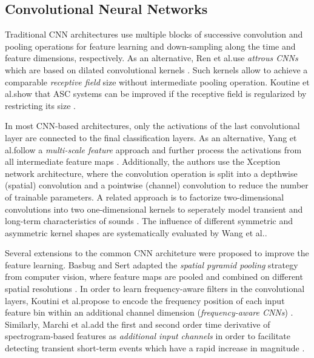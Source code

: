 \documentclass[applsci,article,submit,oneauthor,pdftex]{Definitions/mdpi}
\makeatletter
\newcommand{\etal}{{et al}.\@ }
\makeatother
\begin{document}
\subsection{Convolutional Neural Networks}
\label{sec:cnn}

Traditional CNN architectures use multiple blocks of successive convolution and pooling operations for feature learning and  down-sampling along the time and feature dimensions, respectively.
As an alternative, Ren \etal use \textit{attrous CNNs} which are based on dilated convolutional kernels \citep{Ren:2019:AttrousCNNAttention:ICASSP}. 
Such kernels allow to achieve a comparable \textit{receptive field} size without intermediate pooling operation.
Koutine \etal show that ASC systems can be improved if the receptive field is regularized by restricting its size \citep{Koutini:2019:ASC:DCASE}. 

In most CNN-based architectures, only the activations of the last convolutional layer are connected to the final classification layers.
As an alternative, Yang \etal follow a \textit{multi-scale feature} approach and further process the activations from all intermediate feature maps \citep{Yang:2018:MultiScaleFeatures:DCASE}.
Additionally, the authors use the Xception network architecture, where the convolution operation is split into a depthwise (spatial) convolution and a pointwise (channel) convolution to reduce the number of trainable parameters.
A related approach is to factorize two-dimensional convolutions into two  one-dimensional kernels to seperately model transient and long-term characteristics of sounds \citep{Cho:DCASE:LargeMarginCNN:DCASE, Sharma:2019:SoundClassification:ARXIV}.
The influence of different symmetric and asymmetric kernel shapes are systematically evaluated by Wang \etal  \citep{Wang:2017:ASC:ISCE}.

Several extensions to the common CNN architeture were proposed to improve the feature learning.
Basbug and Sert adapted the \textit{spatial pyramid pooling} strategy from computer vision, where feature maps are pooled and combined on different spatial resolutions \citep{Basbug:2019:SpatialPyramidPoolingASC:ICSC}.
In order to learn frequency-aware filters in the convolutional layers, Koutini \etal propose to encode the frequency position of each input feature bin within an additional channel dimension (\textit{frequency-aware CNNs}) \citep{Koutini:2019:ReceptiveField:DCASE}.
Similarly, Marchi \etal add the first and second order time derivative of spectrogram-based features as \textit{additional input channels} in order to facilitate detecting transient short-term events which have a rapid increase in magnitude \citep{Marchi:2016:MKSL:DCASE}. 
\end{document}
